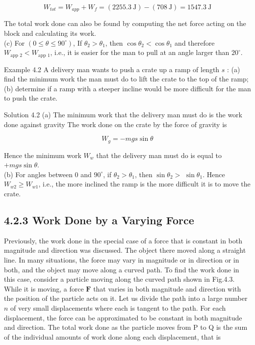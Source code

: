 \documentclass[10pt]{article}
\begin{document}
$$
W_{t o t}=W_{a p p}+W_{f}=(2255.3 \mathrm{~J})-(708 \mathrm{~J})=1547.3 \mathrm{~J}
$$

The total work done can also be found by computing the net force acting on the block and calculating its work.\\
(c) For $\left(0 \leq \theta \leq 90^{\circ}\right)$, If $\theta_{2}>\theta_{1}$, then $\cos \theta_{2}<\cos \theta_{1}$ and therefore $W_{\text {app } 2}<W_{\text {app } 1}$, i.e., it is easier for the man to pull at an angle larger than $20^{\circ}$.

Example 4.2 A delivery man wants to push a crate up a ramp of length $s$ : (a) find the minimum work the man must do to lift the crate to the top of the ramp; (b) determine if a ramp with a steeper incline would be more difficult for the man to push the crate.

Solution 4.2 (a) The minimum work that the delivery man must do is the work done against gravity The work done on the crate by the force of gravity is

$$
W_{g}=-m g s \sin \theta
$$

Hence the minimum work $W_{w}$ that the delivery man must do is equal to $+m g s \sin \theta$.\\
(b) For angles between 0 and $90^{\circ}$, if $\theta_{2}>\theta_{1}$, then $\sin \theta_{2}>$ $\sin \theta_{1}$. Hence $W_{w 2} \geq W_{w 1}$, i.e., the more inclined the ramp is the more difficult it is to move the crate.

\subsection*{4.2.3 Work Done by a Varying Force}
Previously, the work done in the special case of a force that is constant in both magnitude and direction was discussed. The object there moved along a straight line. In many situations, the force may vary in magnitude or in direction or in both, and the object may move along a curved path. To find the work done in this case, consider a particle moving along the curved path shown in Fig.4.3. While it is moving, a force $\mathbf{F}$ that varies in both magnitude and direction with the position of the particle acts on it. Let us divide the path into a large number $n$ of very small displacements where each is tangent to the path. For each displacement, the force can be approximated to be constant in both magnitude and direction. The total work done as the particle moves from P to Q is the sum of the individual amounts of work done along each displacement, that is
\end{document}
